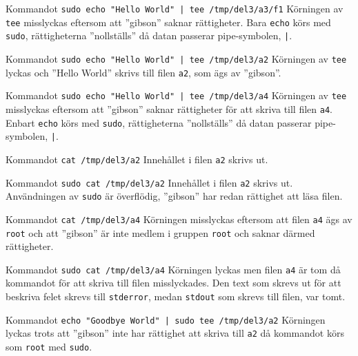              {Kommandot \texttt{sudo echo "Hello World" | tee /tmp/del3/a3/f1}}
             {Körningen av \texttt{tee} misslyckas eftersom att ''gibson''
              saknar rättigheter. Bara \texttt{echo} körs med \texttt{sudo},
              rättigheterna ''nollställs'' då datan passerar pipe-symbolen,
              \texttt{|}.}

             {Kommandot \texttt{sudo echo "Hello World" | tee /tmp/del3/a2}}
             {Körningen av \texttt{tee} lyckas och ''Hello World'' skrivs
              till filen \texttt{a2}, som ägs av ''gibson''.}

             {Kommandot \texttt{sudo echo "Hello World" | tee /tmp/del3/a4}}
             {Körningen av \texttt{tee} misslyckas eftersom att ''gibson''
              saknar rättigheter för att skriva till filen \texttt{a4}. 
              Enbart \texttt{echo} körs med \texttt{sudo}, rättigheterna
              ''nollställs'' då datan passerar pipe-symbolen, \texttt{|}.}

             {Kommandot \texttt{cat /tmp/del3/a2}}
             {Innehållet i filen \texttt{a2} skrivs ut.}

             {Kommandot \texttt{sudo cat /tmp/del3/a2}}
             {Innehållet i filen \texttt{a2} skrivs ut. Användningen av
              \texttt{sudo} är överflödig, ''gibson'' har redan rättighet att
              läsa filen.}

             {Kommandot \texttt{cat /tmp/del3/a4}}
             {Körningen misslyckas eftersom att filen \texttt{a4} ägs av
              \texttt{root} och att ''gibson'' är inte medlem i gruppen 
              \texttt{root} och saknar därmed rättigheter.}

             {Kommandot \texttt{sudo cat /tmp/del3/a4}}
             {Körningen lyckas men filen \texttt{a4} är tom då kommandot för
              att skriva till filen misslyckades. Den text som skrevs ut för
              att beskriva felet skrevs till \texttt{stderror}, medan 
              \texttt{stdout} som skrevs till filen, var tomt.}

             {Kommandot \texttt{echo "Goodbye World" | sudo tee /tmp/del3/a2}}
             {Körningen lyckas trots att ''gibson'' inte har rättighet att
              skriva till \texttt{a2} då kommandot körs som \texttt{root} med
              \texttt{sudo}.}

